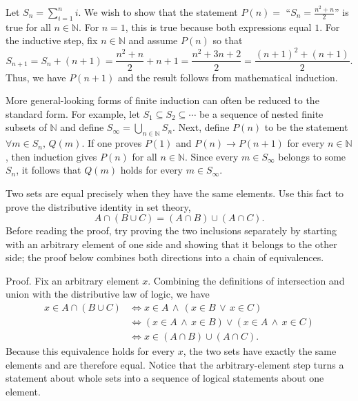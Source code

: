 \begin{example}
Let $S_n = \sum_{i=1}^n i$.
We wish to show that the statement $P(n)=$ ``$S_n = \frac{n^2 + n}{2}$'' is true for all $n\in \mathbb{N}$.
For $n=1$, this is true because both expressions equal $1$.
For the inductive step, fix $n\in\mathbb N$ and assume $P(n)$ so that
\[ S_{n+1} = S_n + (n+1) = \frac{n^2 + n}{2} + n+1 = \frac{n^2 + 3n + 2}{2} = \frac{(n+1)^2+(n+1)}{2}. \]
Thus, we have $P(n+1)$ and the result follows from mathematical induction.
\end{example}

More general-looking forms of finite induction can often be reduced to the standard form.
For example, let $S_1\subseteq S_2\subseteq\cdots$ be a sequence of nested finite subsets of $\mathbb N$ and define $S_\infty=\bigcup_{n\in\mathbb N}S_n$.
Next, define $P(n)$ to be the statement $\forall m\in S_n,\,Q(m)$.
If one proves $P(1)$ and $P(n)\to P(n+1)$ for every $n\in \mathbb{N}$, then induction gives $P(n)$ for all $n\in \mathbb{N}$.
Since every $m\in S_\infty$ belongs to some $S_n$, it follows that $Q(m)$ holds for every $m\in S_\infty$.

\begin{example}
Two sets are equal precisely when they have the same elements.
Use this fact to prove the distributive identity in set theory,
\[
A\cap(B\cup C)=(A\cap B)\cup(A\cap C).
\]
Before reading the proof, try proving the two inclusions separately by starting with an arbitrary element of one side and showing that it belongs to the other side; the proof below combines both directions into a chain of equivalences.

Proof. Fix an arbitrary element $x$.
Combining the definitions of intersection and union with the distributive law of logic, we have
\begin{align*}
x\in A\cap(B\cup C)
&\iff x\in A \,\wedge\, (x\in B \,\vee\, x\in C)\\
&\iff (x\in A \,\wedge\, x\in B)
       \vee (x\in A \,\wedge\, x\in C)\\
&\iff x\in(A\cap B)\cup(A\cap C).
\end{align*}
Because this equivalence holds for every $x$, the two sets have exactly the same elements and are therefore equal.
Notice that the arbitrary-element step turns a statement about whole sets into a sequence of logical statements about one element.
\end{example}


